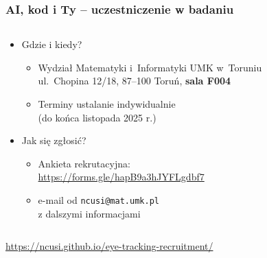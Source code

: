 \documentclass[
  11pt,
  aspectratio=169]{beamer}
\begin{document}
\begin{frame}
  \frametitle{AI, kod i Ty -- uczestniczenie w badaniu}
  \vspace*{4mm}
  \begin{columns}
  \begin{column}{0.72\textwidth}
  \begin{itemize}
  \item Gdzie i kiedy?
    \smallskip
    \begin{itemize}
    \item
      Wydział Matematyki i~Informatyki UMK w~Toruniu\\
      ul.~Chopina 12/18, 87--100 Toruń, \textbf{sala F004}
    \item
      Terminy ustalanie indywidualnie\\
      (do końca listopada 2025 r.)
    \end{itemize}
  \end{itemize}
  \bigskip
  \begin{itemize}
  \item Jak się zgłosić?
    \smallskip
    \begin{itemize}
    \item
      Ankieta rekrutacyjna:\\
      \url{https://forms.gle/hapB9a3hJYFLgdbf7}
    \item
      e-mail od \texttt{ncusi@mat.umk.pl}\\
      z dalszymi informacjami
    \end{itemize}
  \end{itemize}
  \end{column}
  \begin{column}{0.28\textwidth}
  \end{column}
  \end{columns}

  \vfill
  {%
    \centering
    
    \url{https://ncusi.github.io/eye-tracking-recruitment/}

  }
\end{frame}
\end{document}
